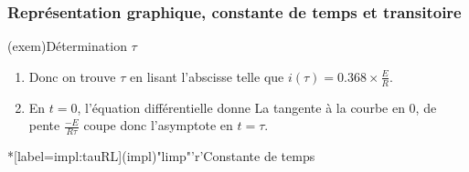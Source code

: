 \documentclass[../../main/main.tex]{subfiles}
\begin{document}
\subsubsection{Représentation graphique, constante de temps et transitoire}
\begin{tcbraster}[raster columns=2, raster equal height=rows]
	\begin{tcb}[label=impl:déterm](exem){Détermination $\tau$}
		\begin{enumerate}
			\item {}
			      \smallbreak
			      Donc on trouve $\tau$ en lisant l'abscisse telle que $i(\tau) =
				      \num{0.368}\times \frac{E}{R}$.
			\item En $t=0$, l'équation différentielle donne
			      \psw{
				      \[
					      \dv{i}{t}\/ (0) + \overbracket[1pt]{\frac{i(0)}{\tau}}^{=E/R}
					      = 0
				      \]
			      }
			      La tangente à la courbe en 0, de pente $\frac{-E}{R\tau}$ coupe
			      donc l'asymptote en $t = \tau$.
		\end{enumerate}
	\end{tcb}
	\begin{tcb}*[label=impl:tauRL](impl)"limp"'r'{Constante de temps}
\end{tcb}
\end{tcbraster}
\end{document}
